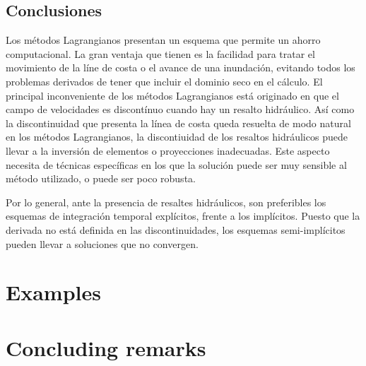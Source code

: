\subsection{Conclusiones}

Los métodos Lagrangianos presentan un esquema que permite un ahorro computacional. La gran ventaja que tienen es la facilidad para tratar el movimiento de la líne de costa o el avance de una inundación, evitando todos los problemas derivados de tener que incluir el dominio seco en el cálculo. El principal inconveniente de los métodos Lagrangianos está originado en que el campo de velocidades es discontínuo cuando hay un resalto hidráulico. Así como la discontinuidad que presenta la línea de costa queda resuelta de modo natural en los métodos Lagrangianos, la discontiuidad de los resaltos hidráulicos puede llevar a la inversión de elementos o proyecciones inadecuadas. Este aspecto necesita de técnicas específicas en los que la solución puede ser muy sensible al método utilizado, o puede ser poco robusta.

Por lo general, ante la presencia de resaltes hidráulicos, son preferibles los esquemas de integración temporal explícitos, frente a los implícitos. Puesto que la derivada no está definida en las discontinuidades, los esquemas semi-implícitos pueden llevar a soluciones que no convergen.




\section{Examples}



\section{Concluding remarks}


